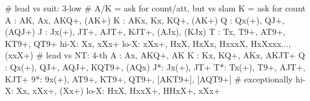 # lead vs suit: 3-low
# A/K = ask for count/att, but vs slam K = ask for count
A : AK, Ax, AKQ+, (AK+)
K : AKx, Kx, KQ+, (AK+)
Q : Qx(+), QJ+, (AQJ+)
J : Jx(+), JT+, AJT+, KJT+, (AJx), (KJx)
T : Tx, T9+, AT9+, KT9+, QT9+
hi-X: Xx, xXx+
lo-X: xXx+, HxX, HxXx, HxxxX, HxXxxx..., (xxX+)
# lead vs NT: 4-th
A : Ax, AKQ+, AK
K : Kx, KQ+, AKx, AKJT+
Q : Qx(+), QJ+, AQJ+, KQT9+, (AQx)
J*: Jx(+), JT+
T*: Tx(+), T9+, AJT+, KJT+
9*: 9x(+), AT9+, KT9+, QT9+, [AKT9+], [AQT9+]  # exceptionally
hi-X: Xx, xXx+, (Xx+)
lo-X: HxX, HxxX+, HHxX+, xXx+
